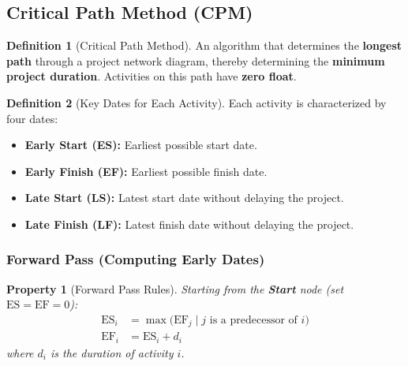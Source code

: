 \documentclass[11pt,a4paper]{article}
\theoremstyle{definition}
\newtheorem{definition}{Definition}[section]
\theoremstyle{plain}
\newtheorem{property}{Property}[section]
\begin{document}
\subsection{Critical Path Method (CPM)}

\begin{definition}[Critical Path Method]
An algorithm that determines the \textbf{longest path} through a project network diagram, thereby determining the \textbf{minimum project duration}. Activities on this path have \textbf{zero float}.
\end{definition}

\begin{definition}[Key Dates for Each Activity]
Each activity is characterized by four dates:
\begin{itemize}[nosep]
  \item \textbf{Early Start (ES):} Earliest possible start date.
  \item \textbf{Early Finish (EF):} Earliest possible finish date.
  \item \textbf{Late Start (LS):} Latest start date without delaying the project.
  \item \textbf{Late Finish (LF):} Latest finish date without delaying the project.
\end{itemize}
\end{definition}

\begin{center}
\end{center}

\subsubsection{Forward Pass (Computing Early Dates)}

\begin{property}[Forward Pass Rules]
Starting from the \textbf{Start} node (set $\mathrm{ES} = \mathrm{EF} = 0$):
\begin{align}
  \mathrm{ES}_i &= \max\bigl(\mathrm{EF}_j \;\big|\; j \text{ is a predecessor of } i\bigr) \\
  \mathrm{EF}_i &= \mathrm{ES}_i + d_i
\end{align}
where $d_i$ is the duration of activity $i$.
\end{property}
\end{document}
